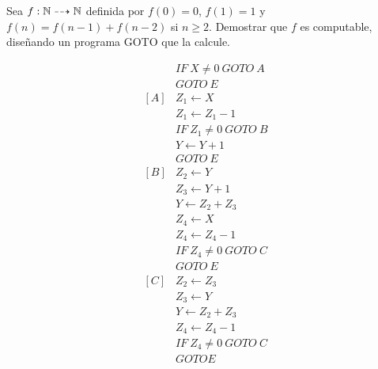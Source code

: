 \documentclass[twoside]{article}
\begin{document}
\begin{ejercicio}{14}
Sea $f : \mathbb{N} \dashrightarrow \mathbb{N}$ definida por $f(0) = 0$, $f(1) = 1$ y $f(n) = f(n - 1) + f(n - 2)$ si
$n \geq 2$. Demostrar que $f$ es computable, diseñando un programa GOTO que la calcule.
\end{ejercicio}
\begin{solucion}
\begin{align*}
 & IF\ X\neq 0\ GOTO\ A\\
 & GOTO\ E\\
[A] & Z_1\leftarrow X\\
    & Z_1\leftarrow Z_1-1\\
    & IF\ Z_1\neq 0\ GOTO\ B\\
    & Y\leftarrow Y+1\\
    & GOTO\ E\\
[B] & Z_2\leftarrow Y\\
    & Z_3\leftarrow Y+1\\
    & Y\leftarrow Z_2+Z_3\\
    & Z_4\leftarrow X\\
    & Z_4\leftarrow Z_4-1\\
    & IF\ Z_4\neq 0\ GOTO\ C\\
    & GOTO\ E\\
[C] & Z_2\leftarrow Z_3\\
    & Z_3\leftarrow Y\\   
    & Y\leftarrow Z_2+Z_3\\
    &Z_4\leftarrow Z_4-1\\
    & IF\ Z_4\neq 0\ GOTO\ C\\
    & GOTO E
\end{align*}
\end{solucion}

\newpage
\end{document}
